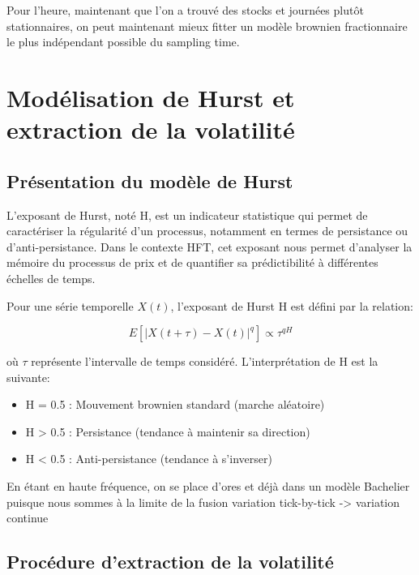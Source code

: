 \documentclass[10pt,a4paper]{article}
\theoremstyle{definition}
\theoremstyle{remark}
\begin{document}
\begin{itemize}
Pour l'heure, maintenant que l'on a trouvé des stocks et journées plutôt stationnaires, on peut maintenant mieux fitter un modèle brownien fractionnaire le plus indépendant possible du sampling time.


\section{Modélisation de Hurst et extraction de la volatilité}

\subsection{Présentation du modèle de Hurst}

L'exposant de Hurst, noté H, est un indicateur statistique qui permet de caractériser la régularité d'un processus, notamment en termes de persistance ou d'anti-persistance. Dans le contexte HFT, cet exposant nous permet d'analyser la mémoire du processus de prix et de quantifier sa prédictibilité à différentes échelles de temps.

Pour une série temporelle \(X(t)\), l'exposant de Hurst H est défini par la relation:

\[
E[|X(t+\tau) - X(t)|^q] \propto \tau^{qH}
\]

où \(\tau\) représente l'intervalle de temps considéré. L'interprétation de H est la suivante:
\begin{itemize}
    \item H = 0.5 : Mouvement brownien standard (marche aléatoire)
    \item H > 0.5 : Persistance (tendance à maintenir sa direction)
    \item H < 0.5 : Anti-persistance (tendance à s'inverser)
\end{itemize}

En étant en haute fréquence, on se place d'ores et déjà dans un modèle Bachelier puisque nous sommes à la limite de la fusion variation tick-by-tick -> variation continue

\subsection{Procédure d'extraction de la volatilité}


\end{itemize}
\end{document}

